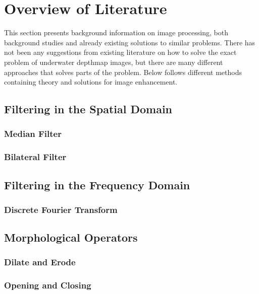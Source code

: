 \section{Overview of Literature}\label{overview}
This section presents background information on image processing, both background studies and already existing solutions to similar problems. 
There has not been any suggestions from existing literature on how to solve the exact problem of underwater depthmap images, but there are many different approaches that solves parts of the problem.
Below follows different methods containing theory and solutions for image enhancement.


\subsection{Filtering in the Spatial Domain}

\subsubsection{Median Filter}

\subsubsection{Bilateral Filter}


\subsection{Filtering in the Frequency Domain}

\subsubsection{Discrete Fourier Transform}


\subsection{Morphological Operators}

\subsubsection{Dilate and Erode}

\subsubsection{Opening and Closing}


